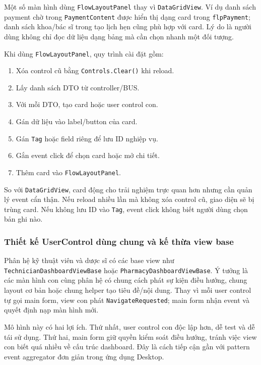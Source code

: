 \documentclass[12pt,a4paper]{article}
\numberwithin{figure}{subsection}
\numberwithin{table}{subsection}
\begin{document}
Một số màn hình dùng \texttt{FlowLayoutPanel} thay vì \texttt{DataGridView}. Ví dụ danh sách payment chờ trong \texttt{PaymentContent} được hiển thị dạng card trong \texttt{flpPayment}; danh sách khoa/bác sĩ trong tạo lịch hẹn cũng phù hợp với card. Lý do là người dùng không chỉ đọc dữ liệu dạng bảng mà cần chọn nhanh một đối tượng.

Khi dùng \texttt{FlowLayoutPanel}, quy trình cài đặt gồm:

\begin{enumerate}
    \item Xóa control cũ bằng \texttt{Controls.Clear()} khi reload.
    \item Lấy danh sách DTO từ controller/BUS.
    \item Với mỗi DTO, tạo card hoặc user control con.
    \item Gán dữ liệu vào label/button của card.
    \item Gán \texttt{Tag} hoặc field riêng để lưu ID nghiệp vụ.
    \item Gắn event click để chọn card hoặc mở chi tiết.
    \item Thêm card vào \texttt{FlowLayoutPanel}.
\end{enumerate}

So với \texttt{DataGridView}, card động cho trải nghiệm trực quan hơn nhưng cần quản lý event cẩn thận. Nếu reload nhiều lần mà không xóa control cũ, giao diện sẽ bị trùng card. Nếu không lưu ID vào \texttt{Tag}, event click không biết người dùng chọn bản ghi nào.

\subsubsection{Thiết kế UserControl dùng chung và kế thừa view base}

Phân hệ kỹ thuật viên và dược sĩ có các base view như \texttt{TechnicianDashboardViewBase} hoặc \texttt{PharmacyDashboardViewBase}. Ý tưởng là các màn hình con cùng phân hệ có chung cách phát sự kiện điều hướng, chung layout cơ bản hoặc chung helper tạo tiêu đề/nội dung. Thay vì mỗi user control tự gọi main form, view con phát \texttt{NavigateRequested}; main form nhận event và quyết định nạp màn hình mới.

Mô hình này có hai lợi ích. Thứ nhất, user control con độc lập hơn, dễ test và dễ tái sử dụng. Thứ hai, main form giữ quyền kiểm soát điều hướng, tránh việc view con biết quá nhiều về cấu trúc dashboard. Đây là cách tiếp cận gần với pattern event aggregator đơn giản trong ứng dụng Desktop.
\end{document}
